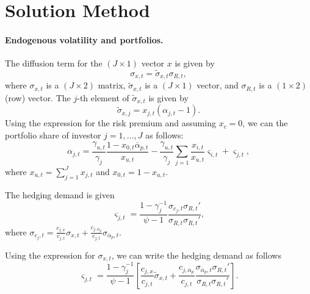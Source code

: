 \section{Solution Method}

\paragraph{Endogenous volatility and portfolios.} The diffusion term for the $(J\times1)$ vector $x$ is given by
\begin{equation}\label{eq:sigmax}
	\sigma_{x,t} = \widetilde{\sigma}_{x,t} \sigma_{R,t},
\end{equation}
where $\sigma_{x,t}$ is a $(J\times 2)$ matrix, $\widetilde{\sigma}_{x,t}$ is a $(J\times 1)$ vector, and $\sigma_{R,t}$ is a $(1\times 2)$ (row) vector. The $j$-th element of $\widetilde{\sigma}_{x,t}$ is given by 
\begin{equation}
	\widetilde{\sigma}_{x,j}=x_{j,t}(\alpha_{j,t}-1).
\end{equation}
Using the expression for the risk premium and assuming $ x_c=0 $, we can the portfolio share of investor $j =1,\ldots, J$ as follows:
\begin{equation}
	\alpha_{j,t} = \frac{\gamma_{u,t}}{\gamma_j} \frac{1-x_{0,t} \overline{\alpha}_{p,t}}{x_{u,t}} - \frac{\gamma_{u,t}}{\gamma_j} \sum_{j=1} \frac{x_{i,t}}{x_{u,t}} \varsigma_{i,t} + \varsigma_{j,t},
\end{equation}
where $x_{u,t} = \sum_{j=1}^J x_{j,t} $ and $x_{0,t} = 1-x_{u,t}$.

The hedging demand is given 
\begin{equation}
	\varsigma_{j,t} = \frac{1-\gamma_j^{-1}}{\psi-1} \frac{\sigma_{c_j,t} \sigma_{R,t}'}{\sigma_{R,t}\sigma_{R,t}'},
\end{equation}
where $\sigma_{c_j,t} = \frac{c_{j,x}}{c_{j,t}} \sigma_{x,t} + \frac{c_{j,\overline{\alpha}_p}}{c_{j,t}} \sigma_{\overline{\alpha}_p,t}$.

Using the expression for $\sigma_{x,t}$, we can write the hedging demand as follows
\begin{equation}
	\varsigma_{j,t} = \frac{1-\gamma_j^{-1}}{\psi-1} \left[\frac{c_{j,x}}{c_{j,t}} \widetilde{\sigma}_{x,t}+\frac{c_{j,\overline{\alpha}_p}}{c_{j,t}} \frac{\sigma_{\overline{\alpha}_p,t} \sigma_{R,t}'}{\sigma_{R,t}\sigma_{R,t}'}\right].
\end{equation}

